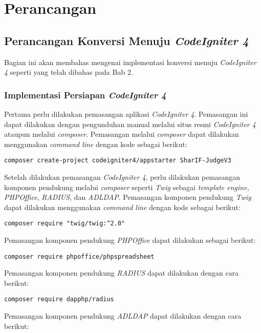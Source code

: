 \chapter{Perancangan}
\label{chap:perancangan}

\section{Perancangan Konversi Menuju \textit{CodeIgniter 4}}
Bagian ini akan membahas mengenai implementasi konversi menuju \textit{CodeIgniter 4} seperti yang telah dibahas pada Bab 2.
\subsection{Implementasi Persiapan \textit{CodeIgniter 4}}
Pertama perlu dilakukan pemasangan aplikasi \textit{CodeIgniter 4}. Pemasangan ini dapat dilakukan dengan pengunduhan manual melalui situs resmi \textit{CodeIgniter 4} ataupun melalui \textit{composer}. Pemasangan melalui \textit{composer} dapat dilakukan menggunakan \textit{command line} dengan kode sebagai berikut:
\begin{center}
\verb|composer create-project codeigniter4/appstarter SharIF-JudgeV3|
\end{center}

Setelah dilakukan pemasangan \textit{CodeIgniter 4}, perlu dilakukan pemasangan komponen pendukung melalui \textit{composer} seperti \textit{Twig} sebagai \textit{template engine}, \textit{PHPOffice}, \textit{RADIUS}, dan \textit{ADLDAP}. Pemasangan komponen pendukung \textit{Twig} dapat dilakukan menggunakan \textit{command line} dengan kode sebagai berikut:

\begin{center}
\verb|composer require "twig/twig:^2.0"|
\end{center}

Pemasangan komponen pendukung \textit{PHPOffice} dapat dilakukan sebagai berikut:

\begin{center}
	\verb|composer require phpoffice/phpspreadsheet|
\end{center}

Pemasangan komponen pendukung \textit{RADIUS} dapat dilakukan dengan cara berikut:

\begin{center}
	\verb|composer require dapphp/radius|
\end{center}

Pemasangan komponen pendukung \textit{ADLDAP} dapat dilakukan dengan cara berikut:

